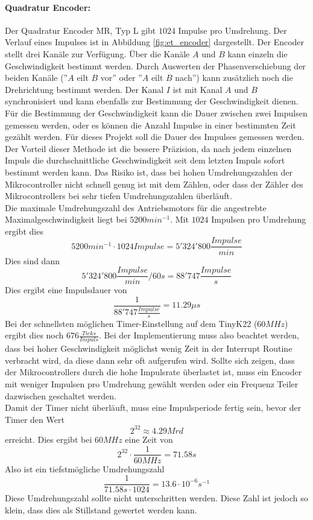 \documentclass[../../main.tex]{subfiles}
\begin{document}
    \paragraph{Quadratur Encoder:} Der Quadratur Encoder MR, Typ L gibt $1024$ Impulse pro Umdrehung. Der Verlauf eines Impulses ist in Abbildung \ref{fig:et_encoder} dargestellt. Der Encoder stellt drei Kanäle zur Verfügung. Über die Kanäle $A$ und $B$ kann einzeln die Geschwindigkeit bestimmt werden. Durch Auswerten der Phasenverschiebung der beiden Kanäle (''$A$ eilt $B$ vor'' oder ''$A$ eilt $B$ nach'') kann zusätzlich noch die Drehrichtung bestimmt werden. Der Kanal $I$ ist mit Kanal $A$ und $B$ synchronisiert und kann ebenfalls zur Bestimmung der Geschwindigkeit dienen.\\
    Für die Bestimmung der Geschwindigkeit kann die Dauer zwischen zwei Impulsen gemessen werden, oder es können die Anzahl Impulse in einer bestimmten Zeit gezählt werden. Für dieses Projekt soll die Dauer des Impulses gemessen werden. Der Vorteil dieser Methode ist die bessere Präzision, da nach jedem einzelnen Impuls die durchschnittliche Geschwindigkeit seit dem letzten Impuls sofort bestimmt werden kann. Das Risiko ist, dass bei hohen Umdrehungszahlen der Mikrocontroller nicht schnell genug ist mit dem Zählen, oder dass der Zähler des Mikrocontrollers bei sehr tiefen Umdrehungszahlen überläuft.\\
    Die maximale Umdrehungszahl des Antriebsmotors für die angestrebte Maximalgeschwindigkeit liegt bei $5200 min^{-1}$. Mit $1024$ Impulsen pro Umdrehung ergibt dies $$5200 min^{-1} \cdot 1024 Impulse = 5'324'800 \frac{Impulse}{min}$$
    Dies sind dann $$ 5'324'800 \frac{Impulse}{min} / 60s = 88'747 \frac{Impulse}{s} $$
    Dies ergibt eine Impulsdauer von $$\frac{1}{88'747 \frac{Impulse}{s}} = 11.29\mu s$$ Bei der schnellsten möglichen
    Timer-Einstellung auf dem TinyK22 ($60MHz$) ergibt dies noch $676 \frac{Ticks}{Impuls}$. Bei der Implementierung
    muss also beachtet werden, dass bei hoher Geschwindigkeit möglichst wenig Zeit in der Interrupt Routine verbracht
    wird, da diese dann sehr oft aufgerufen wird. Sollte sich zeigen, dass der Mikrocontrollers durch die hohe Impulsrate
    überlastet ist, muss ein Encoder mit weniger Impulsen pro Umdrehung gewählt werden oder ein Frequenz Teiler
    dazwischen geschaltet werden.\\
    Damit der Timer nicht überläuft, muss eine Impulsperiode fertig sein, bevor der Timer den Wert $$2^{32} \approx 4.29 Mrd$$ erreicht. Dies ergibt bei $60MHz$ eine Zeit von $$2^{32} \cdot \frac{1}{60MHz} = 71.58s$$ Also ist ein tiefstmögliche Umdrehungszahl $$\frac{1}{71.58s \cdot 1024} = 13.6 \cdot 10^{-6} s^{-1}$$
    Diese Umdrehungszahl sollte nicht unterschritten werden. Diese Zahl ist jedoch so klein, dass dies als Stillstand gewertet werden kann.
\end{document}
